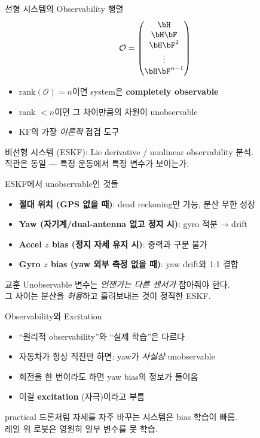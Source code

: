 \begin{frame}{선형 시스템의 Observability 행렬}
  \[
    \mathcal{O} = \begin{pmatrix} \bH \\ \bH \bF \\ \bH \bF^2 \\ \vdots \\ \bH \bF^{n-1} \end{pmatrix}
  \]
  \begin{itemize}
    \item $\mathrm{rank}(\mathcal{O}) = n$이면 system은 \textbf{completely observable}
    \item rank $< n$이면 그 차이만큼의 차원이 unobservable
    \item KF의 가장 \emph{이론적} 점검 도구
  \end{itemize}
  \pause
  \vspace{0.3em}
  비선형 시스템 (ESKF): Lie derivative / nonlinear observability 분석.\\
  직관은 동일 — 특정 운동에서 특정 변수가 보이는가.
\end{frame}

\begin{frame}{ESKF에서 unobservable인 것들}
  \begin{itemize}
    \item \textbf{절대 위치 (GPS 없을 때)}: dead reckoning만 가능, 분산 무한 성장
    \item \textbf{Yaw (자기계/dual-antenna 없고 정지 시)}: gyro 적분 → drift
    \item \textbf{Accel $z$ bias (정지 자세 유지 시)}: 중력과 구분 불가
    \item \textbf{Gyro $z$ bias (yaw 외부 측정 없을 때)}: yaw drift와 1:1 결합
  \end{itemize}
  \pause
  \vspace{0.3em}
  \begin{block}{교훈}
    Unobservable 변수는 \emph{언젠가는 다른 센서가} 잡아줘야 한다. \\
    그 사이는 분산을 \emph{허용}하고 흘려보내는 것이 정직한 ESKF.
  \end{block}
\end{frame}

\begin{frame}{Observability와 Excitation}
  \begin{itemize}
    \item ``원리적 observability''와 ``실제 학습''은 다르다
    \item 자동차가 항상 직진만 하면: yaw가 \emph{사실상} unobservable
    \item 회전을 한 번이라도 하면 yaw bias의 정보가 들어옴
    \item 이걸 \textbf{excitation} (자극)이라고 부름
  \end{itemize}
  \pause
  \vspace{0.3em}
  \begin{block}{practical}
    드론처럼 자세를 자주 바꾸는 시스템은 bias 학습이 빠름. \\
    레일 위 로봇은 영원히 일부 변수를 못 학습.
  \end{block}
\end{frame}

